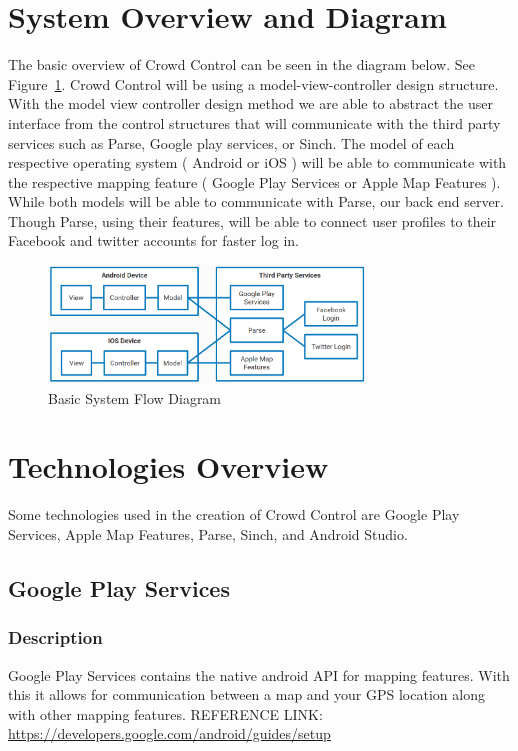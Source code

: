 \section{System Overview and Diagram}
The basic overview of Crowd Control can be seen in the diagram below. See Figure~\ref{ModuleFlowDiagram}. Crowd Control will be using a model-view-controller design structure. With the model view controller design method we are able to abstract the user interface from the control structures that will communicate with the third party services such as Parse, Google play services, or Sinch. The model of each respective operating system ( Android or iOS ) will be able to communicate with the respective mapping feature ( Google Play Services or Apple Map Features ). While both models will be able to communicate with Parse, our back end server. Though Parse, using their features, will be able to connect user profiles to their Facebook and twitter accounts for faster log in.

\begin{figure}[tbh]
\begin{center}
\includegraphics[width=0.75\textwidth]{Additional/designpictures/ModuleFlowDiagram.png}
\end{center}
\caption{Basic System Flow Diagram \label{ModuleFlowDiagram}}
\end{figure}

\section{Technologies Overview}
Some technologies used in the creation of Crowd Control are Google Play Services, Apple Map Features, Parse, Sinch, and Android Studio.

\subsection{Google Play Services}
	\subsubsection{Description}
	Google Play Services contains the native android API for mapping features. With this it allows for communication between a map and your GPS location along with other mapping features.
\newline
REFERENCE LINK:  \url{https://developers.google.com/android/guides/setup}
